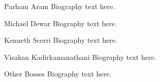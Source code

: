 \documentclass[onecolumn,draftcls]{IEEEtran}
\begin{document}
\begin{IEEEbiography}{Parham Aram}
Biography text here.
\end{IEEEbiography}


\begin{IEEEbiography}{Michael Dewar}
Biography text here.
\end{IEEEbiography}

\begin{IEEEbiography}{Kenneth Scerri}
Biography text here.
\end{IEEEbiography}

\begin{IEEEbiography}{Visakan Kadirkamanathani}
Biography text here.
\end{IEEEbiography}

\begin{IEEEbiography}{Other Bosses}
Biography text here.
\end{IEEEbiography}

\end{document}
